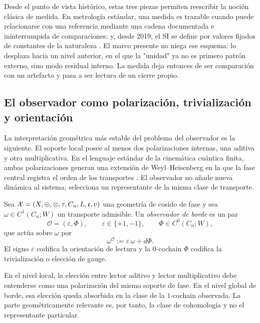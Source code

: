 Desde el punto de vista histórico, estas tres piezas permiten reescribir la noción clásica de
medida. En metrología estándar, una medida es trazable cuando puede relacionarse con una referencia
mediante una cadena documentada e ininterrumpida de comparaciones; y, desde 2019, el SI se define
por valores fijados de constantes de la naturaleza \cite{NISTTraceability2023,BIPMSI2019}.
El marco presente no niega ese esquema: lo desplaza hacia un nivel anterior, en el que la
"unidad" ya no es primero patrón externo, sino modo residual interno. La medida deja entonces de
ser comparación con un artefacto y pasa a ser lectura de un cierre propio.

\subsection{El observador como polarización, trivialización y orientación}

La interpretación geométrica más estable del problema del observador es la siguiente. El soporte
local posee al menos dos polarizaciones internas, una aditiva y otra multiplicativa. En el lenguaje
estándar de la cinemática cuántica finita, ambas polarizaciones generan una extensión de
Weyl--Heisenberg en la que la fase central registra el orden de los transportes
\cite{Tolar2014,Vourdas2006}. El observador no añade nueva dinámica al sistema; selecciona un
representante de la misma clase de transporte.

\begin{definition}
Sea $\mathcal X=(X,\oplus,\otimes,\tau,C_n,L,\mathfrak c,v)$ una geometría de cosido de fase y sea
$\omega\in C^1(C_n;W)$ un transporte admisible. Un \emph{observador de borde} es un par
\[
\mathcal O=(\varepsilon,\Phi),
\qquad
\varepsilon\in\{+1,-1\},
\qquad
\Phi\in C^0(C_n;W),
\]
que actúa sobre $\omega$ por
\[
\omega^{\mathcal O}:=\varepsilon\,\omega+d\Phi.
\]
El signo $\varepsilon$ codifica la orientación de lectura y la $0$-cochain $\Phi$ codifica la
trivialización o elección de gauge.
\end{definition}

\begin{remark}
En el nivel local, la elección entre lector aditivo y lector multiplicativo debe entenderse como una
polarización del mismo soporte de fase. En el nivel global de borde, esa elección queda absorbida en
la clase de la $1$-cochain observada. La parte geométricamente relevante es, por tanto, la clase de
cohomología y no el representante particular.
\end{remark}

